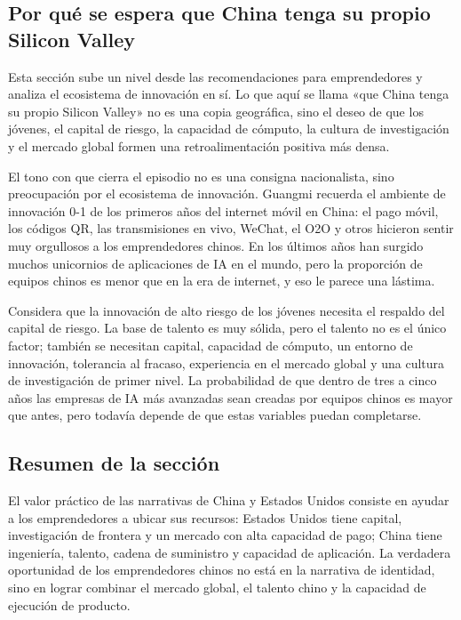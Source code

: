 \subsection{Por qué se espera que China tenga su propio Silicon Valley}

Esta sección sube un nivel desde las recomendaciones para emprendedores y analiza el ecosistema de innovación en sí. Lo que aquí se llama «que China tenga su propio Silicon Valley» no es una copia geográfica, sino el deseo de que los jóvenes, el capital de riesgo, la capacidad de cómputo, la cultura de investigación y el mercado global formen una retroalimentación positiva más densa.

El tono con que cierra el episodio no es una consigna nacionalista, sino preocupación por el ecosistema de innovación. Guangmi recuerda el ambiente de innovación 0-1 de los primeros años del internet móvil en China: el pago móvil, los códigos QR, las transmisiones en vivo, WeChat, el O2O y otros hicieron sentir muy orgullosos a los emprendedores chinos. En los últimos años han surgido muchos unicornios de aplicaciones de IA en el mundo, pero la proporción de equipos chinos es menor que en la era de internet, y eso le parece una lástima.

Considera que la innovación de alto riesgo de los jóvenes necesita el respaldo del capital de riesgo. La base de talento es muy sólida, pero el talento no es el único factor; también se necesitan capital, capacidad de cómputo, un entorno de innovación, tolerancia al fracaso, experiencia en el mercado global y una cultura de investigación de primer nivel. La probabilidad de que dentro de tres a cinco años las empresas de IA más avanzadas sean creadas por equipos chinos es mayor que antes, pero todavía depende de que estas variables puedan completarse.

\subsection{Resumen de la sección}

El valor práctico de las narrativas de China y Estados Unidos consiste en ayudar a los emprendedores a ubicar sus recursos: Estados Unidos tiene capital, investigación de frontera y un mercado con alta capacidad de pago; China tiene ingeniería, talento, cadena de suministro y capacidad de aplicación. La verdadera oportunidad de los emprendedores chinos no está en la narrativa de identidad, sino en lograr combinar el mercado global, el talento chino y la capacidad de ejecución de producto.
